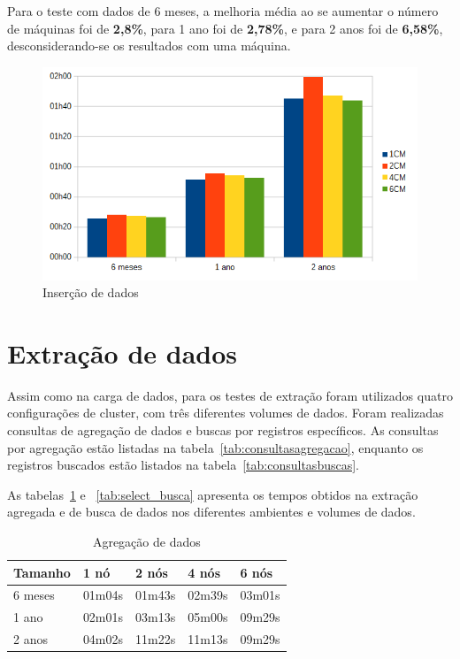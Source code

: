 Para o teste com dados de 6 meses, a melhoria média ao se aumentar o número de máquinas foi de \textbf{2,8\%}, para 1 ano foi de \textbf{2,78\%}, e para 2 anos foi de \textbf{6,58\%}, desconsiderando-se os resultados com uma máquina.

\begin{figure}[!htb]
	\centering
	\includegraphics[width=1\textwidth]{figuras/graphinsert.png}
	\caption{Inserção de dados}
	\label{fig:graphinsert}
\end{figure}

\section{Extração de dados}
Assim como na carga de dados, para os testes de extração foram utilizados quatro configurações de cluster, com três diferentes volumes de dados. Foram realizadas consultas de agregação de dados e buscas por registros específicos.
As consultas por agregação estão listadas na tabela~\ref{tab:consultasagregacao}, enquanto os registros buscados estão listados na tabela~\ref{tab:consultasbuscas}.

As tabelas~\ref{tab:select_agreg} e ~\ref{tab:select_busca} apresenta os tempos obtidos na extração agregada e de busca de dados nos diferentes ambientes e volumes de dados.

\begin{table}[]
	\centering
	\caption{Agregação de dados}
	\label{tab:select_agreg}
	\begin{tabular}{lllll}
		\textbf{Tamanho} & \textbf{1 nó} & \textbf{2 nós} & \textbf{4 nós} & \textbf{6 nós} \\ \hline
		6 meses          & 01m04s        & 01m43s         & 02m39s         & 03m01s         \\ \hline
		1 ano            & 02m01s        & 03m13s         & 05m00s         & 09m29s         \\ \hline
		2 anos           & 04m02s        & 11m22s         & 11m13s         & 09m29s         \\ \hline
	\end{tabular}
\end{table}

